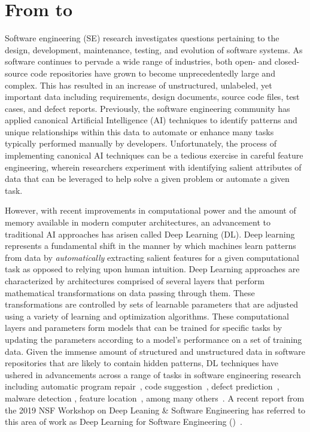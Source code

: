 \section{From \sw to \asw}
\label{sec:asofte}

Software engineering (SE) research investigates questions pertaining to the design, development, maintenance, testing, and evolution of software systems. As software continues to pervade a wide range of industries, both open- and closed-source code repositories have grown to become unprecedentedly large and complex. This has resulted in an increase of unstructured, unlabeled, yet important data including requirements, design documents, source code files, test cases, and defect reports. Previously, the software engineering community has applied canonical Artificial Intelligence (AI) techniques to identify patterns and unique relationships within this data to automate or enhance many tasks typically performed manually by developers. Unfortunately, the process of implementing canonical AI techniques can be a tedious exercise in careful feature engineering, wherein researchers experiment with identifying salient attributes of data that can be leveraged to help solve a given problem or automate a given task.

However, with recent improvements in computational power and the amount of memory available in modern computer architectures, an advancement to traditional AI approaches has arisen called Deep Learning (DL). Deep learning represents a fundamental shift in the manner by which machines learn patterns from data by \textit{automatically} extracting salient features for a given computational task as opposed to relying upon human intuition. Deep Learning approaches are characterized by architectures comprised of several layers that perform mathematical transformations on data passing through them. These transformations are controlled by sets of learnable parameters that are adjusted using a variety of learning and optimization algorithms. These computational layers and parameters form models that can be trained for specific tasks by updating the parameters according to a model's performance on a set of training data. Given the immense amount of structured and unstructured data in software repositories that are likely to contain hidden patterns, DL techniques have ushered in advancements across a range of tasks in software engineering research including automatic program repair~\citep{Tufano2018}, code suggestion~\citep{Gu2018}, defect prediction~\citep{Wang2016}, malware detection \cite{Li2018}, feature location~\citep{Corley2015}, among many others~\citep{Ma2018, Wan2018, Liu2018, White2016, Xu2016, Guo2017, Tian2018a, Liu2017}. A recent report from the 2019 NSF Workshop on Deep Leaning \& Software Engineering has referred to this area of work as Deep Learning for Software Engineering (\dlse)~\citep{dlse19-report}. 

